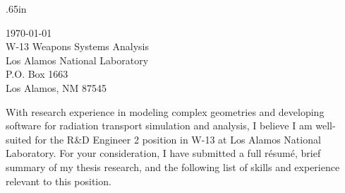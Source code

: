 
\begin{center}
\begin{minipage}{\textwidth}

  \normalsize

	\vspace{2mm}
  
  \begingroup
  \leftskip.65in
  \rightskip\leftskip

\today \\
W-13 Weapons Systems Analysis\\
Los Alamos National Laboratory \\
P.O. Box 1663 \\
Los Alamos, NM 87545
  
  \vspace{4mm} 

With research experience in modeling complex geometries and developing
software for radiation transport simulation and analysis, I believe I am
well-suited for the R\&D Engineer 2  position in W-13
at Los Alamos National Laboratory.
For your consideration, I have submitted a full r\'{e}sum\'{e}, brief summary of my thesis research, and
the following list of skills and
experience relevant to this position. \\



\end{minipage}
\end{center}
